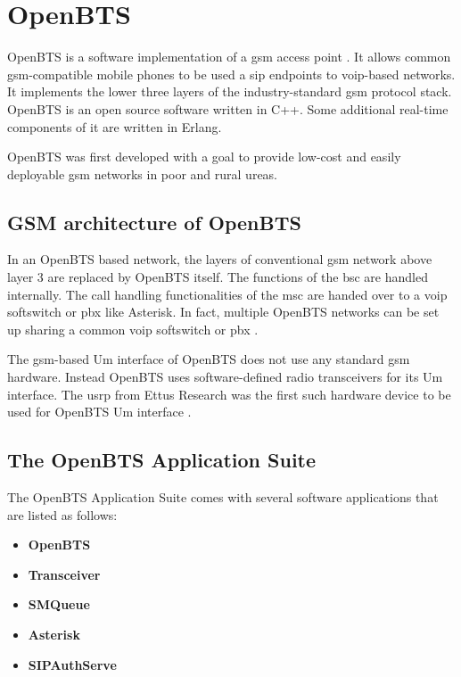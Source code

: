 \chapter{OpenBTS}

OpenBTS is a software implementation of a \gls{gsm} access point \cite{wikiOpenBTS}.
It allows common \gls{gsm}-compatible mobile phones to be used a \gls{sip} endpoints to \gls{voip}-based
networks. It implements the lower three layers of the industry-standard \gls{gsm}
protocol stack. OpenBTS is an open source software written in C++. Some 
additional real-time components of it are written in Erlang.

OpenBTS was first developed with a goal to provide low-cost and easily 
deployable \gls{gsm} networks in poor and rural ureas.

\section{GSM architecture of OpenBTS}
In an OpenBTS based network, the layers of conventional \gls{gsm} network above layer 3
are replaced by OpenBTS itself. The functions of the \gls{bsc} are handled internally.
The call handling functionalities of the \gls{msc} are handed over to a \gls{voip} 
softswitch or \gls{pbx} like Asterisk. In fact, multiple OpenBTS networks 
can be set up sharing a common \gls{voip} softswitch or \gls{pbx} \cite{wikiOpenBTS}.

The \gls{gsm}-based Um interface of OpenBTS 
does not use any standard \gls{gsm} hardware. Instead OpenBTS uses software-defined
radio transceivers for its Um interface. The \gls{usrp} from Ettus Research was the
first such hardware device to be used for OpenBTS Um interface \cite{wikiOpenBTS}.



\section{The OpenBTS Application Suite}
The OpenBTS Application Suite comes with several software applications that 
are listed as follows:

\begin{itemize}
\item \textbf{OpenBTS}
\item \textbf{Transceiver}
\item \textbf{SMQueue}
\item \textbf{Asterisk}
\item \textbf{SIPAuthServe}
\end{itemize}

